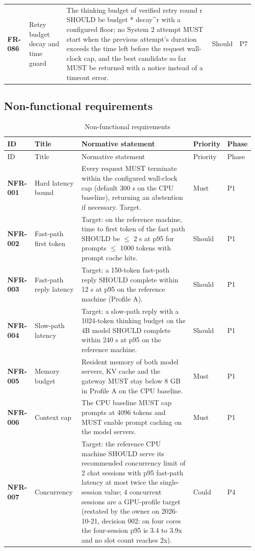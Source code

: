 \begin{longtable}{@{}p{1.45cm}p{2.5cm}p{8.1cm}p{1.6cm}p{1.1cm}@{}}
\textbf{FR-086} & Retry budget decay and time guard & The thinking budget of verified retry round r SHOULD be budget * decay^r with a configured floor; no System 2 attempt MUST start when the previous attempt's duration exceeds the time left before the request wall-clock cap, and the best candidate so far MUST be returned with a notice instead of a timeout error. & Should & P7\\
\end{longtable}

\subsection{Non-functional requirements}
\begin{longtable}{@{}p{1.45cm}p{2.5cm}p{8.1cm}p{1.6cm}p{1.1cm}@{}}
\caption{Non-functional requirements}\\
\toprule ID & Title & Normative statement & Priority & Phase\\\midrule\endfirsthead
\toprule ID & Title & Normative statement & Priority & Phase\\\midrule\endhead
\bottomrule\endfoot
\textbf{NFR-001} & Hard latency bound & Every request MUST terminate within the configured wall-clock cap (default 300 s on the CPU baseline), returning an abstention if necessary. Target. & Must & P1\\
\textbf{NFR-002} & Fast-path first token & Target: on the reference machine, time to first token of the fast path SHOULD be $\le$ 2 s at p95 for prompts $\le$ 1000 tokens with prompt cache hits. & Should & P1\\
\textbf{NFR-003} & Fast-path reply latency & Target: a 150-token fast-path reply SHOULD complete within 12 s at p95 on the reference machine (Profile A). & Should & P1\\
\textbf{NFR-004} & Slow-path latency & Target: a slow-path reply with a 1024-token thinking budget on the 4B model SHOULD complete within 240 s at p95 on the reference machine. & Should & P1\\
\textbf{NFR-005} & Memory budget & Resident memory of both model servers, KV cache and the gateway MUST stay below 8 GB in Profile A on the CPU baseline. & Must & P1\\
\textbf{NFR-006} & Context cap & The CPU baseline MUST cap prompts at 4096 tokens and MUST enable prompt caching on the model servers. & Must & P1\\
\textbf{NFR-007} & Concurrency & Target: the reference CPU machine SHOULD serve its recommended concurrency limit of 2 chat sessions with p95 fast-path latency at most twice the single-session value; 4 concurrent sessions are a GPU-profile target (restated by the owner on 2026-10-21, decision 002: on four cores the four-session p95 is 3.4 to 3.9x and no slot count reaches 2x). & Could & P4\\

\end{longtable}
